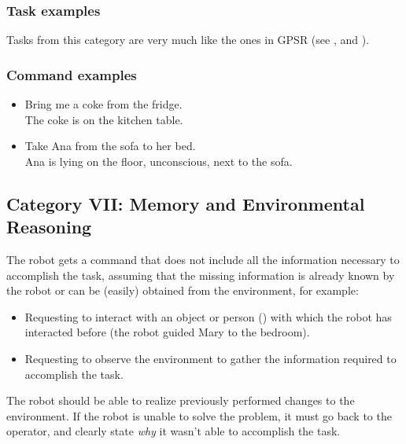 \subsubsection{Task examples}
Tasks from this category are very much like the ones in GPSR (see ,  and ).

\subsubsection{Command examples}
\begin{itemize}
	\item Bring me a coke from the fridge. \\
	The coke is on the kitchen table. \\

	\item Take Ana from the sofa to her bed. \\
	Ana is lying on the floor, unconscious, next to the sofa. \\
\end{itemize}


%
%
\subsection{Category VII: Memory and Environmental Reasoning}
\label{sec:eegpsr-category7-explained}
The robot gets a command that does not include all the information necessary to accomplish the task, assuming that the missing information is already known by the robot or can be (easily) obtained from the environment, for example:
\begin{itemize}
	\item Requesting to interact with an object or person () with which the robot has interacted before (the robot guided Mary to the bedroom).
	\item Requesting to observe the environment to gather the information required to accomplish the task.
\end{itemize}

The robot should be able to realize previously performed changes to the environment. If the robot is unable to solve the problem, it must go back to the operator, and clearly state \textit{why} it wasn't able to accomplish the task.


